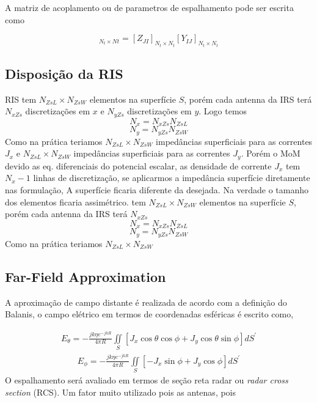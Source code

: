 \documentclass[
	12pt,				%
	openright,			%
	oneside,			%
	a4paper,			%
	english,			%
	brazil				%
	]{abntex2}
\begin{document}
 A matriz de acoplamento ou de parametros de espalhamento pode ser escrita como

\begin{equation}
  [S_{JJ}]_{N_t \times Nt}= [Z_{JI}]_{N_t \times N_t} [Y_{IJ}]_{N_t \times N_t}
\end{equation}

\subsection{Disposição da RIS}
RIS tem $N_{ZsL} \times N_{ZsW}$ elementos na superfície $S$, porém cada antenna da IRS terá $N_{xZs}$ discretizações em $x$ e $N_{yZs}$ discretizações em $y$.  Logo temos
\begin{equation}
    N_{x}=N_{xZs}N_{ZsL}
\end{equation}
\begin{equation}
    N_{y}=N_{yZs}N_{ZsW}
\end{equation}
 Como na prática teriamos $N_{ZsL} \times N_{ZsW}$ impedâncias superficiais para as correntes $J_x$ e  $N_{ZsL} \times N_{ZsW}$ impedâncias superficiais para as correntes $J_y$.
Porém o MoM devido as eq. diferenciais do potencial escalar, as densidade de corrente $J_x$ tem $N_{x}-1$ linhas de discretização, se aplicarmos a impedância superfície diretamente nas formulação, A superfície ficaria diferente da desejada. Na verdade o tamanho dos elementos ficaria assimétrico.
 tem $N_{ZsL} \times N_{ZsW}$ elementos na superfície $S$, porém cada antenna da IRS terá $N_{xZs}$
\begin{equation}
    N_{x}=N_{xZs}N_{ZsL}
\end{equation}
\begin{equation}
    N_{y}=N_{yZs}N_{ZsW}
\end{equation}
 Como na prática teriamos $N_{ZsL} \times N_{ZsW}$  
 
\subsection{Far-Field Approximation}

A aproximação de campo distante é realizada de acordo com a definição do Balanis, o campo elétrico em termos de coordenadas esféricas é escrito como,

 \begin{equation}
\begin{aligned}
E_{\theta}=-\frac{jk \eta e^{-j kR}}{4\pi R} 
  \iint \limits_S [J_x \cos{\theta} \cos{\phi}+J_y \cos{\theta} \sin{\phi}] dS^{'}
   \end{aligned}
\end{equation}
 \begin{equation}
\begin{aligned}
E_{\phi}=-\frac{jk\eta e^{-jkR}}{4\pi R} 
  \iint \limits_S [-J_x  \sin{\phi} +J_y \cos{\phi} ] dS^{'}
   \end{aligned}
\end{equation}
O espalhamento será avaliado em termos de seção reta radar ou \emph{radar cross section} (RCS). Um fator muito utilizado pois as antenas,  pois
\end{document}
